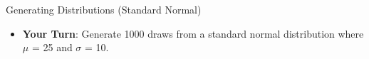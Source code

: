 \documentclass[
  ignorenonframetext,
]{beamer}
\providecommand{\tightlist}{%
  \setlength{\itemsep}{0pt}\setlength{\parskip}{0pt}}
\begin{document}
\begin{frame}{Generating Distributions (Standard Normal)}
\label{generating-distributions-standard-normal-1}
\begin{itemize}
\tightlist
\item
  \textbf{Your Turn}: Generate 1000 draws from a standard normal
  distribution where \(\mu\) = 25 and \(\sigma\) = 10.
\end{itemize}
\end{frame}
\end{document}
